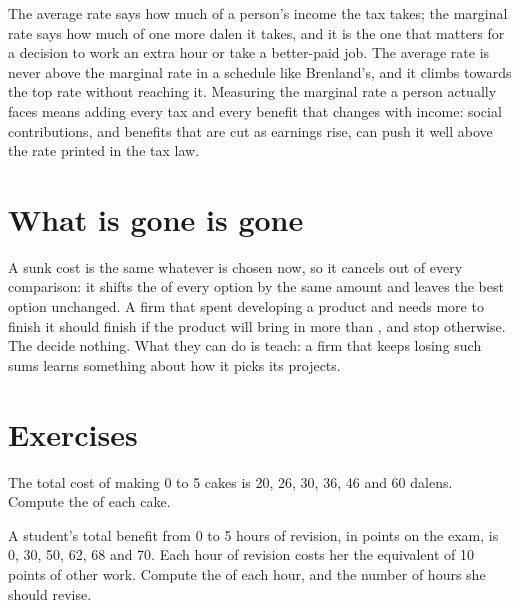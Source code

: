 \begin{measure}
The average rate says how much of a person's income the tax takes; the marginal rate says how much of one more dalen it takes, and it is the one that matters for
a decision to work an extra hour or take a better-paid job. The average rate is never above the marginal rate in a schedule like Brenland's, and it climbs towards
the top rate without reaching it. Measuring the marginal rate a person actually faces means adding every tax and every benefit that changes with income: social
contributions, and benefits that are cut as earnings rise, can push it well above the rate printed in the tax law.
\end{measure}

\section{What is gone is gone}\label{sec:g11:marginal-reasoning:sunk}

A sunk cost is the same whatever is chosen now, so it cancels out of every comparison: it shifts the  of every option by the same amount and leaves the
best option unchanged. A firm that spent  developing a product and needs  more to finish it should finish if the product will bring in more than
, and stop otherwise. The  decide nothing. What they can do is teach: a firm that keeps losing such sums learns something about how it picks its
projects.

\section{Exercises}

\begin{exercise}[$\star$]\label{exo:g11:marginal-reasoning:1}
The total cost of making 0 to 5 cakes is 20, 26, 30, 36, 46 and 60 dalens. Compute the  of each cake.
\end{exercise}

\begin{exercise}[$\star$]\label{exo:g11:marginal-reasoning:2}
A student's total benefit from 0 to 5 hours of revision, in points on the exam, is 0, 30, 50, 62, 68 and 70. Each hour of revision costs her the equivalent of 10
points of other work. Compute the  of each hour, and the number of hours she should revise.
\end{exercise}

